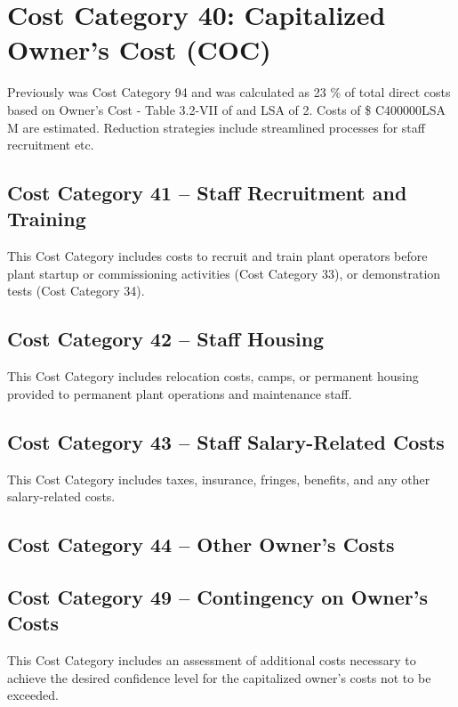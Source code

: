 
\section{Cost Category 40: Capitalized Owner’s Cost (COC)}

Previously was Cost Category 94 and was calculated as 23 \% of total direct costs based on Owner's Cost - Table 3.2-VII of \cite{SCH78} and LSA of 2. Costs of \$ C400000LSA M are estimated. Reduction strategies include streamlined processes for staff recruitment etc.

\subsection*{Cost Category 41 – Staff Recruitment and Training}
This Cost Category includes costs to recruit and train plant operators before plant startup or commissioning activities (Cost Category 33), or demonstration tests (Cost Category 34).

\subsection*{Cost Category 42 – Staff Housing}
This Cost Category includes relocation costs, camps, or permanent housing provided to permanent plant operations and maintenance staff.

\subsection*{Cost Category 43 – Staff Salary-Related Costs}
This Cost Category includes taxes, insurance, fringes, benefits, and any other salary-related costs.

\subsection*{Cost Category 44 – Other Owner’s Costs}

\subsection*{Cost Category 49 – Contingency on Owner’s Costs}
This Cost Category includes an assessment of additional costs necessary to achieve the desired confidence level for the capitalized owner’s costs not to be exceeded.
